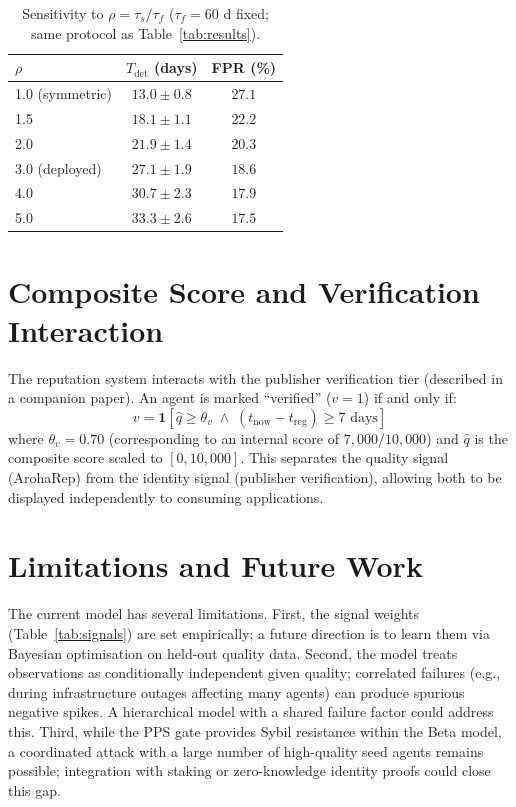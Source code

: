 \documentclass[conference]{IEEEtran}
\begin{document}
\begin{table}[t]
\centering
\caption{Sensitivity to $\rho = \tau_s/\tau_f$
($\tau_f = 60$ d fixed; same protocol as
Table~\ref{tab:results}).}
\label{tab:sensitivity}
\begin{tabular}{lcc}
\toprule
$\rho$ & $T_{\text{det}}$ (days) & FPR (\%) \\
\midrule
1.0 (symmetric) & $13.0 \pm 0.8$ & $27.1$ \\
1.5             & $18.1 \pm 1.1$ & $22.2$ \\
2.0             & $21.9 \pm 1.4$ & $20.3$ \\
3.0 (deployed)  & $27.1 \pm 1.9$ & $18.6$ \\
4.0             & $30.7 \pm 2.3$ & $17.9$ \\
5.0             & $33.3 \pm 2.6$ & $17.5$ \\
\bottomrule
\end{tabular}
\end{table}

\section{Composite Score and Verification Interaction}
\label{sec:verified}

The reputation system interacts with the publisher
verification tier (described in a companion paper). An agent
is marked ``verified'' ($v = 1$) if and only if:
\begin{equation}
  v = \mathbf{1}\!\left[
    \hat{q} \geq \theta_v
    \;\wedge\;
    (t_{\text{now}} - t_{\text{reg}}) \geq 7 \text{ days}
  \right]
  \label{eq:verified}
\end{equation}
where $\theta_v = 0.70$ (corresponding to an internal
score of $7{,}000/10{,}000$) and $\hat{q}$
is the composite score scaled to $[0, 10{,}000]$.
This separates the quality signal (ArohaRep) from the identity
signal (publisher verification), allowing both to be
displayed independently to consuming applications.

\section{Limitations and Future Work}
\label{sec:limits}

The current model has several limitations. First, the signal
weights (Table~\ref{tab:signals}) are set empirically; a
future direction is to learn them via Bayesian optimisation
on held-out quality data. Second, the model treats
observations as conditionally independent given quality;
correlated failures (e.g., during infrastructure outages
affecting many agents) can produce spurious negative spikes.
A hierarchical model with a shared failure factor could
address this. Third, while the PPS gate provides Sybil
resistance within the Beta model, a coordinated attack
with a large number of high-quality seed agents remains
possible; integration with staking or zero-knowledge
identity proofs could close this gap.
\end{document}
